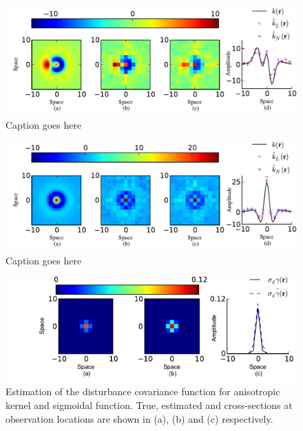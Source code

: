 \documentclass[10pt,twocolumn,twoside]{IEEEtran}
\begin{document}
\begin{figure}[ht]
	\centering
		\includegraphics[scale=1]{./Graph/AnisoKernelIEEE1.pdf}
	\caption{Caption goes here}
	\label{fig:label}
\end{figure}

\begin{figure}[ht]
	\centering
		\includegraphics[scale=1]{./Graph/IsoKernelIEEE.pdf}
	\caption{Caption goes here}
	\label{fig:label}
\end{figure}  

\begin{figure}[ht]
	\centering
		\includegraphics[scale=1]{./Graph/DisturbanceWidthEstimation.pdf}
	\caption{Estimation of the disturbance covariance function for anisotropic kernel and sigmoidal function. True, estimated and cross-sections at observation locations are shown in (a), (b) and (c) respectively.}
	\label{fig:label}
\end{figure}
\end{document}
